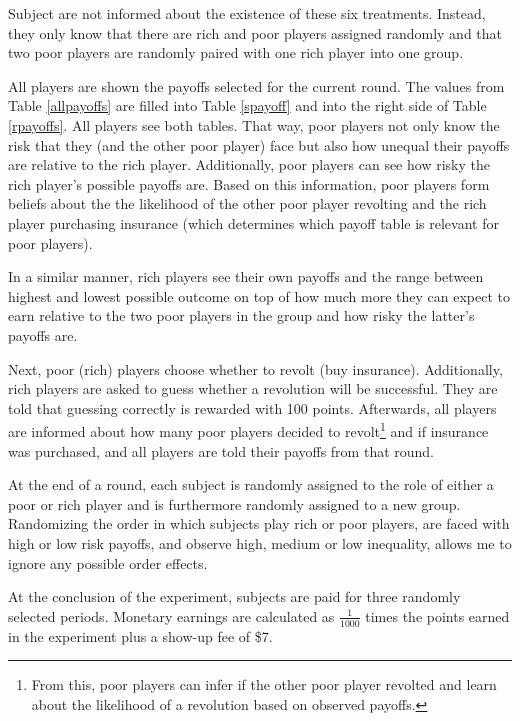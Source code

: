 \documentclass[12pt]{article}
\begin{document}
	Subject are not informed about the existence of these six treatments. 
	Instead, they only know that there are rich and poor players assigned 
	randomly and that two poor players are randomly paired with one rich player 
	into one group.
	
	All players are shown the payoffs selected for the current round. 
	The values from Table \ref{allpayoffs} are filled into Table \ref{spayoff} 
	and into the right side of Table \ref{rpayoffs}. All players see both 
	tables. That way, poor players not only know the risk that they (and the 
	other poor player) face but also how unequal their payoffs are relative to 
	the rich player. Additionally, poor players can see how risky the rich 
	player's possible payoffs are. Based on this information, poor players form 
	beliefs about the the likelihood of the other poor player revolting and the 
	rich player purchasing insurance (which determines which payoff table is 
	relevant for poor players). 
	
	In a similar manner, rich players see their own payoffs and the range 
	between highest and lowest possible outcome on top of how much more they 
	can expect to earn relative to the two poor players in the group and how 
	risky the latter's payoffs are.
	
	Next, poor (rich) players choose whether to revolt (buy insurance). 
	Additionally, rich players are asked to guess whether a revolution will be 
	successful. They are told that guessing correctly is rewarded with 100 
	points.
	Afterwards, all players are informed about how many poor players decided to 
	revolt\footnote{From this, poor players can infer if the other poor player 
	revolted and learn about the likelihood of a revolution based on observed 
	payoffs.} and if insurance was purchased, and all players are told their 
	payoffs from that round.
	
	At the end of a round, each subject is randomly assigned to the role of 
	either a poor or rich player and is furthermore randomly assigned to a new 
	group. Randomizing the order in which subjects play rich or poor players, 
	are faced with high or low risk payoffs, and observe high, medium or low 
	inequality, allows me to ignore any possible order effects.
	
	At the conclusion of the experiment, subjects are paid for three randomly 
	selected periods. Monetary earnings are calculated as $\frac{1}{1000}$ 
	times the points earned in the experiment plus a show-up fee of \$7.
	
\end{document}
